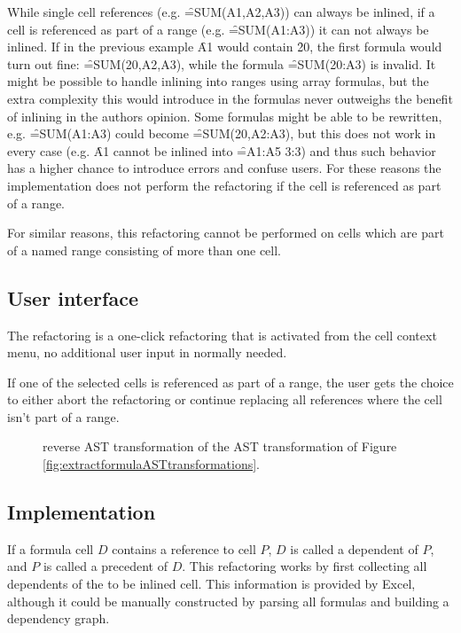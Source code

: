 While single cell references (e.g. \f{=SUM(A1,A2,A3)}) can always be inlined, if a cell is referenced as part of a range (e.g. \f{=SUM(A1:A3)}) it can not always be inlined.
If in the previous example \f{A1} would contain \f{20}, the first formula would turn out fine: \f{=SUM(20,A2,A3)}, while the formula \f{=SUM(20:A3)} is invalid.
It might be possible to handle inlining into ranges using array formulas, but the extra complexity this would introduce in the formulas never outweighs the benefit of inlining in the authors opinion.
Some formulas might be able to be rewritten, e.g. \f{=SUM(A1:A3)} could become \f{=SUM(20,A2:A3)}, but this does not work in every case (e.g. \f{A1} cannot be inlined into \f{=A1:A5 3:3}) and thus such behavior has a higher chance to introduce errors and confuse users.
For these reasons the implementation does not perform the refactoring if the cell is referenced as part of a range.

For similar reasons, this refactoring cannot be performed on cells which are part of a named range consisting of more than one cell.

\subsection{User interface}

The refactoring is a one-click refactoring that is activated from the cell context menu, no additional user input in normally needed.

If one of the selected cells is referenced as part of a range, the user gets the choice to either abort the refactoring or continue replacing all references where the cell isn't part of a range.

\begin{figure}
	\centering
	
	\caption{ reverse AST transformation of the  AST transformation of Figure \ref{fig:extractformulaASTtransformations}.}
	\label{fig:inlineformulaAST}
\end{figure}

\subsection{Implementation}
\label{subsec:inlineformulaimplementation}

If a formula cell $D$ contains a reference to cell $P$, $D$ is called a dependent of $P$, and $P$ is called a precedent of $D$.
This refactoring works by first collecting all dependents of the to be inlined cell.
This information is provided by Excel, although it could be manually constructed by parsing all formulas and building a dependency graph.


